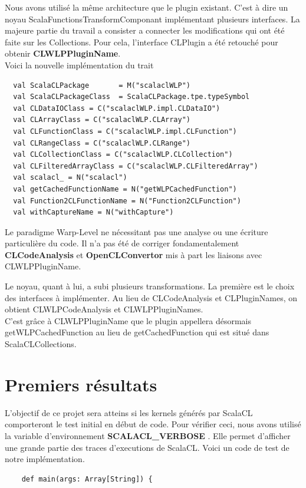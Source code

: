 \documentclass[a4paper,11pt]{report}
\begin{document}
{{{Nous avons utilisé la même architecture que le plugin existant. C'est à dire un noyau ScalaFunctionsTransformComponant implémentant plusieurs interfaces. La majeure partie du travail a consister a connecter les modifications qui ont été faite sur les Collections. Pour cela, l'interface CLPlugin a été retouché pour obtenir {\bf CLWLPPluginName}. \\

Voici la nouvelle implémentation du trait
\vspace{6mm}
\vspace{6mm}
\begin{lstlisting}
  val ScalaCLPackage       = M("scalaclWLP")
  val ScalaCLPackageClass  = ScalaCLPackage.tpe.typeSymbol
  val CLDataIOClass = C("scalaclWLP.impl.CLDataIO")
  val CLArrayClass = C("scalaclWLP.CLArray")
  val CLFunctionClass = C("scalaclWLP.impl.CLFunction")
  val CLRangeClass = C("scalaclWLP.CLRange")
  val CLCollectionClass = C("scalaclWLP.CLCollection")
  val CLFilteredArrayClass = C("scalaclWLP.CLFilteredArray")
  val scalacl_ = N("scalacl")
  val getCachedFunctionName = N("getWLPCachedFunction")
  val Function2CLFunctionName = N("Function2CLFunction")
  val withCaptureName = N("withCapture")
\end{lstlisting}
\vspace{6mm}\vspace{6mm}
\normalsize{

Le paradigme Warp-Level ne nécessitant pas une analyse ou une écriture particulière du code. Il n'a pas été de corriger fondamentalement {\bf CLCodeAnalysis} et {\bf OpenCLConvertor} mis à part les liaisons avec CLWLPPluginName.\\
}

\normalsize{
Le noyau, quant à lui, a subi plusieurs transformations. La première est le choix des interfaces à implémenter. Au lieu de CLCodeAnalysis et CLPluginNames, on obtient CLWLPCodeAnalysis et CLWLPPluginNames.\\

C'est grâce à CLWLPPluginName que le plugin appellera désormais getWLPCachedFunction au lieu de getCachedFunction qui est situé dans ScalaCLCollections.
}

\newpage
\section{Premiers résultats}
\vspace{6mm}
\normalsize{
L'objectif de ce projet sera atteins si les kernels générés par ScalaCL comporteront le test initial en début de code. Pour vérifier ceci, nous avons utilisé la variable d'environnement               {\bf SCALACL\_VERBOSE} . Elle permet d'afficher une grande partie des traces d'executions de ScalaCL. Voici un code de test de notre implémentation.
}
\vspace{6mm}
\begin{lstlisting}
    def main(args: Array[String]) {


\end{lstlisting}}}}
\end{document}
